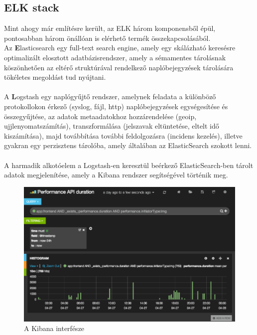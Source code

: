 \subsection{ELK stack}
Mint ahogy már említésre került, az ELK három komponensből épül, pontosabban három önállóan is elérhető termék összekapcsolásából.\\
Az \textbf{E}lasticsearch egy full-text search engine, amely egy skálázható keresésre optimalizált elosztott adatbázisrendszer, amely a sémamentes tárolásnak köszönhetően az eltérő struktúrával rendelkező naplóbejegyzések tárolására tökéletes megoldást tud nyújtani.\\
\hfill\\
A \textbf{L}ogstash egy naplógyűjtő rendszer, amelynek feladata a különböző protokollokon érkező (syslog, fájl, http) naplóbejegyzések egységesítése és összegyűjtése, az adatok metaadatokhoz hozzárendelése (geoip, ujjlenyomatszámítás), transzformálása (jelszavak eltüntetése, eltelt idő kiszámítása), majd továbbítása további feldolgozásra (incidens kezelés), illetve gyakran egy perzisztens tárolóba, amely általában az ElasticSearch szokott lenni.\\
\hfill\\
A harmadik alkotóelem a Logstash-en keresztül beérkező ElasticSearch-ben tárolt adatok megjelenítése, amely a Kibana rendszer segítségével történik meg.

\begin{figure}[ht]
	\centering
		\includegraphics[scale=0.5]{assets/elk.png}%
		\caption[DUMMY]%
		{A Kibana interfésze}%
		\label{fig:kibana-webinterface}
\end{figure}

